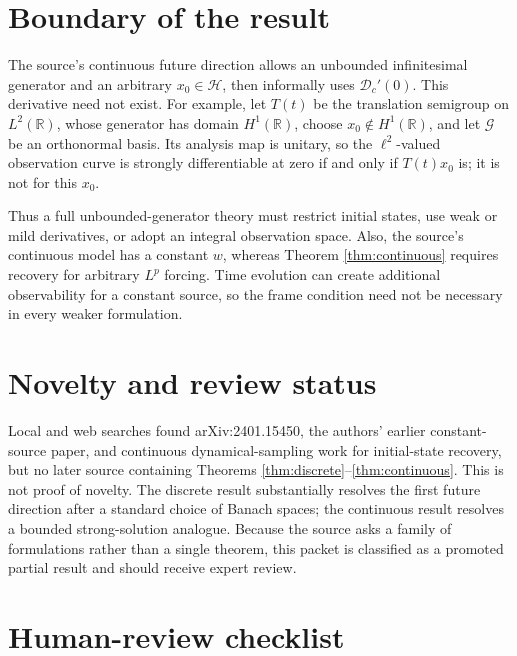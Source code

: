 \documentclass[11pt]{article}
\newcommand{\Hh}{\mathcal H}
\newcommand{\Gg}{\mathcal G}
\begin{document}
\section{Boundary of the result}

The source's continuous future direction allows an unbounded infinitesimal
generator and an arbitrary \(x_0\in\Hh\), then informally uses
\(\mathcal D_c'(0)\). This derivative need not exist. For example, let
\(T(t)\) be the translation semigroup on \(L^2(\mathbb R)\), whose generator
has domain \(H^1(\mathbb R)\), choose \(x_0\notin H^1(\mathbb R)\), and let
\(\Gg\) be an orthonormal basis. Its analysis map is unitary, so the
\(\ell^2\)-valued observation curve is strongly differentiable at zero if and
only if \(T(t)x_0\) is; it is not for this \(x_0\).

Thus a full unbounded-generator theory must restrict initial states, use weak
or mild derivatives, or adopt an integral observation space. Also, the
source's continuous model has a constant \(w\), whereas Theorem
\ref{thm:continuous} requires recovery for arbitrary \(L^p\) forcing. Time
evolution can create additional observability for a constant source, so the
frame condition need not be necessary in every weaker formulation.

\section{Novelty and review status}

Local and web searches found arXiv:2401.15450, the authors' earlier
constant-source paper, and continuous dynamical-sampling work for
initial-state recovery, but no later source containing Theorems
\ref{thm:discrete}--\ref{thm:continuous}. This is not proof of novelty.
The discrete result substantially resolves the first future direction after
a standard choice of Banach spaces; the continuous result resolves a bounded
strong-solution analogue. Because the source asks a family of formulations
rather than a single theorem, this packet is classified as a promoted partial
result and should receive expert review.

\section*{Human-review checklist}
\end{document}
